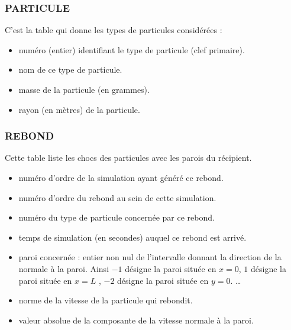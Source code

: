 \subsubsection{PARTICULE}
C'est la table qui donne les types de particules considérées :
\begin{itemize}
\item {} numéro (entier) identifiant le type de particule (clef primaire).
\item {} nom de ce type de particule.
\item {} masse de la particule (en grammes).
\item {} rayon (en mètres) de la particule.
\end{itemize}
\subsubsection{REBOND}
Cette table liste les chocs des particules avec les parois du récipient.
\begin{itemize}
\item {} numéro d'ordre de la simulation ayant généré ce rebond.
\item {} numéro d'ordre du rebond au sein de cette simulation.
\item {} numéro du type de particule concernée par ce rebond.
\item {} temps de simulation (en secondes) auquel ce rebond est arrivé.
\item {} paroi concernée : entier non nul de l'intervalle  donnant la direction de la normale à la paroi. Ainsi $-1$ désigne la paroi située en $x=0$, $1$ désigne la paroi située en $x=L$ , $-2$ désigne la paroi située en $y=0$. \dots
\item {} norme de la vitesse de la particule qui rebondit.
\item {} valeur absolue de la composante de la vitesse normale à la paroi.
\end{itemize}


\newpage

